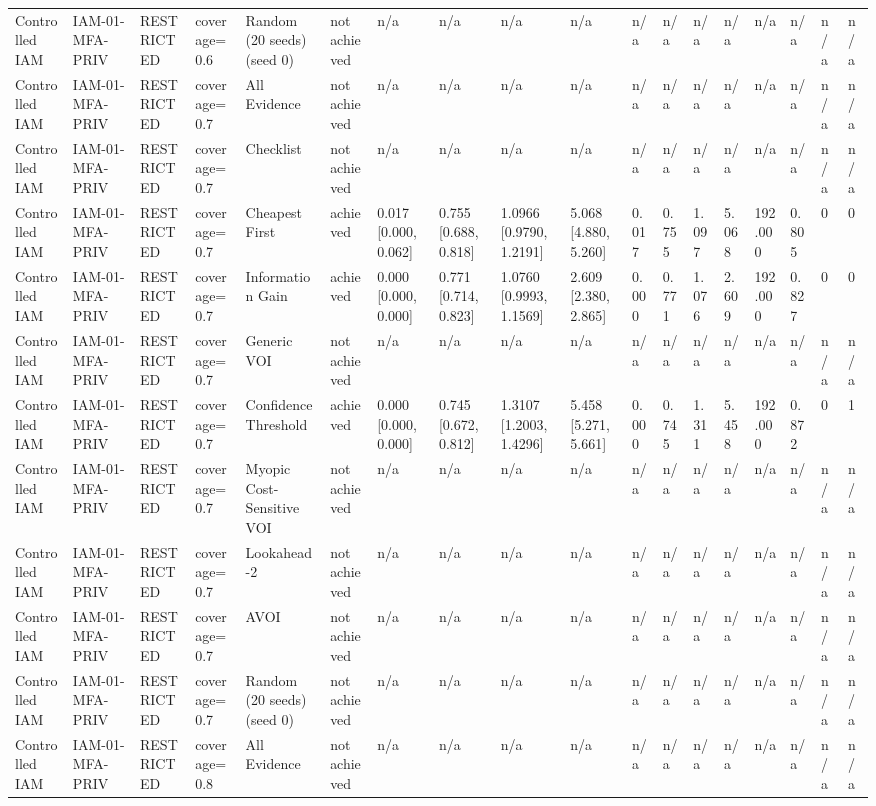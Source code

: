 \begin{table}[!ht]
{\begin{tabular}{llllllllllllllllll}
Controlled IAM & IAM-01-MFA-PRIV & RESTRICTED & coverage=0.6 & Random (20 seeds) (seed 0) & not achieved & n/a & n/a & n/a & n/a & n/a & n/a & n/a & n/a & n/a & n/a & n/a & n/a \\
Controlled IAM & IAM-01-MFA-PRIV & RESTRICTED & coverage=0.7 & All Evidence & not achieved & n/a & n/a & n/a & n/a & n/a & n/a & n/a & n/a & n/a & n/a & n/a & n/a \\
Controlled IAM & IAM-01-MFA-PRIV & RESTRICTED & coverage=0.7 & Checklist & not achieved & n/a & n/a & n/a & n/a & n/a & n/a & n/a & n/a & n/a & n/a & n/a & n/a \\
Controlled IAM & IAM-01-MFA-PRIV & RESTRICTED & coverage=0.7 & Cheapest First & achieved & 0.017 [0.000, 0.062] & 0.755 [0.688, 0.818] & 1.0966 [0.9790, 1.2191] & 5.068 [4.880, 5.260] & 0.017 & 0.755 & 1.097 & 5.068 & 192.000 & 0.805 & 0 & 0 \\
Controlled IAM & IAM-01-MFA-PRIV & RESTRICTED & coverage=0.7 & Information Gain & achieved & 0.000 [0.000, 0.000] & 0.771 [0.714, 0.823] & 1.0760 [0.9993, 1.1569] & 2.609 [2.380, 2.865] & 0.000 & 0.771 & 1.076 & 2.609 & 192.000 & 0.827 & 0 & 0 \\
Controlled IAM & IAM-01-MFA-PRIV & RESTRICTED & coverage=0.7 & Generic VOI & not achieved & n/a & n/a & n/a & n/a & n/a & n/a & n/a & n/a & n/a & n/a & n/a & n/a \\
Controlled IAM & IAM-01-MFA-PRIV & RESTRICTED & coverage=0.7 & Confidence Threshold & achieved & 0.000 [0.000, 0.000] & 0.745 [0.672, 0.812] & 1.3107 [1.2003, 1.4296] & 5.458 [5.271, 5.661] & 0.000 & 0.745 & 1.311 & 5.458 & 192.000 & 0.872 & 0 & 1 \\
Controlled IAM & IAM-01-MFA-PRIV & RESTRICTED & coverage=0.7 & Myopic Cost-Sensitive VOI & not achieved & n/a & n/a & n/a & n/a & n/a & n/a & n/a & n/a & n/a & n/a & n/a & n/a \\
Controlled IAM & IAM-01-MFA-PRIV & RESTRICTED & coverage=0.7 & Lookahead-2 & not achieved & n/a & n/a & n/a & n/a & n/a & n/a & n/a & n/a & n/a & n/a & n/a & n/a \\
Controlled IAM & IAM-01-MFA-PRIV & RESTRICTED & coverage=0.7 & AVOI & not achieved & n/a & n/a & n/a & n/a & n/a & n/a & n/a & n/a & n/a & n/a & n/a & n/a \\
Controlled IAM & IAM-01-MFA-PRIV & RESTRICTED & coverage=0.7 & Random (20 seeds) (seed 0) & not achieved & n/a & n/a & n/a & n/a & n/a & n/a & n/a & n/a & n/a & n/a & n/a & n/a \\
Controlled IAM & IAM-01-MFA-PRIV & RESTRICTED & coverage=0.8 & All Evidence & not achieved & n/a & n/a & n/a & n/a & n/a & n/a & n/a & n/a & n/a & n/a & n/a & n/a \\

\end{tabular}}
\end{table}
